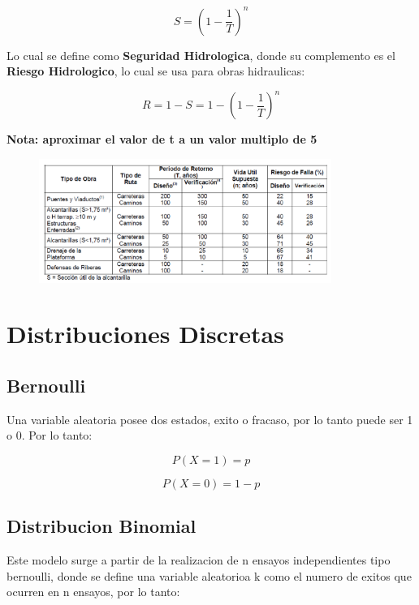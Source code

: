 \begin{equation}
    S = (1 - \frac{1}{T})^n 
\end{equation}

Lo cual se define como \textbf{Seguridad Hidrologica}, donde su complemento es el \textbf{Riesgo Hidrologico}, lo cual se usa para obras hidraulicas:

\begin{equation}
    R = 1- S = 1 - (1 - \frac{1}{T})^n
\end{equation}

\textbf{Nota: aproximar el valor de t a un valor multiplo de 5}

\begin{figure}[H]
    \centering
    \includegraphics[width=0.85\textwidth]{imagenes/Qmi.png}
    \label{fig:Qmi}
\end{figure}

\section{Distribuciones Discretas}

\subsection{Bernoulli}

Una variable aleatoria posee dos estados, exito o fracaso, por lo tanto puede ser 1 o 0. Por lo tanto:

\begin{equation}
    P(X = 1) = p
\end{equation}

\begin{equation}
    P(X = 0) = 1 - p
\end{equation}

\subsection{Distribucion Binomial}

Este modelo surge a partir de la realizacion de n ensayos independientes tipo bernoulli, donde se define una variable aleatorioa k como el numero de exitos que ocurren en n ensayos, por lo tanto:

